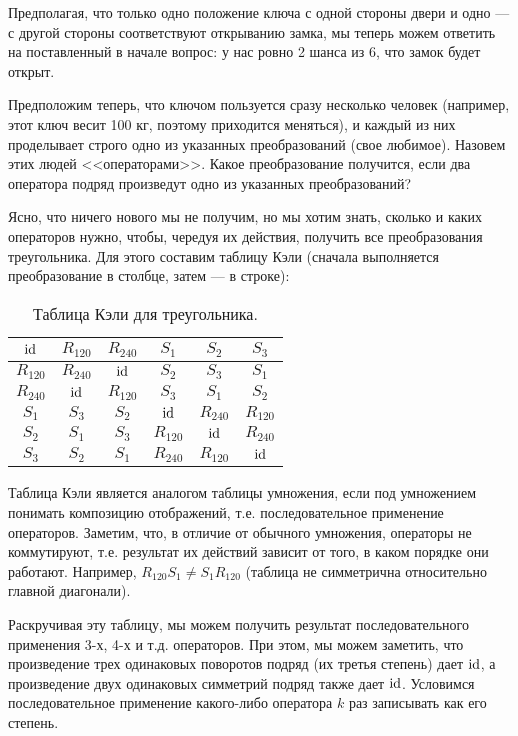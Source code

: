 Предполагая, что только одно положение ключа с одной стороны двери и одно --- с другой стороны соответствуют открыванию замка, мы теперь можем ответить на поставленный в начале вопрос: у нас ровно 2 шанса из 6, что замок будет открыт.

Предположим теперь, что ключом пользуется сразу несколько человек (например, этот ключ весит 100 кг, поэтому приходится меняться), и каждый из них проделывает строго одно из указанных преобразований (свое любимое). Назовем этих людей <<операторами>>. Какое преобразование получится, если два оператора подряд произведут одно из указанных преобразований?

Ясно, что ничего нового мы не получим, но мы хотим знать, сколько и каких операторов нужно, чтобы, чередуя их действия, получить все преобразования треугольника. Для этого составим таблицу Кэли (сначала выполняется преобразование в столбце, затем --- в строке):

\begin{table}\begin{center}
\begin{tabular}{c|c|c|c|c|c|}
$\mathrm{id}$     & $R_{120}$ & $R_{240}$ & $S_1$ & $S_2$ & $S_3$ \\
\hline
$R_{120}$ & $R_{240}$ & $\mathrm{id}$     & $S_2$ & $S_3$ & $S_1$ \\
\hline
$R_{240}$ & $\mathrm{id}$     & $R_{120}$ & $S_3$ & $S_1$ & $S_2$ \\
\hline
$S_1$     & $S_3$     & $S_2$     & $\mathrm{id}$ & $R_{240}$ & $R_{120}$ \\
\hline
$S_2$     & $S_1$     & $S_3$     & $R_{120}$ & $\mathrm{id}$ & $R_{240}$ \\
\hline
$S_3$     & $S_2$     & $S_1$     & $R_{240}$ & $R_{120}$ & $\mathrm{id}$\\
\hline
\end{tabular}
\caption{Таблица Кэли для треугольника.}\label{triangle}
\end{center}\end{table}

Таблица Кэли является аналогом таблицы умножения, если под умножением понимать композицию отображений, т.е. последовательное применение операторов. Заметим, что, в отличие от обычного умножения, операторы не коммутируют, т.е. результат их действий зависит от того, в каком порядке они работают. Например, $R_{120}S_1\ne S_1R_{120}$ (таблица не симметрична относительно главной диагонали).

Раскручивая эту таблицу, мы можем получить результат последовательного применения 3-х, 4-х и т.д. операторов. При этом, мы можем заметить, что произведение трех одинаковых поворотов подряд (их третья степень) дает $\mathrm{id}$, а произведение двух одинаковых симметрий подряд также дает $\mathrm{id}$. Условимся последовательное применение какого-либо оператора $k$ раз записывать как его степень.

